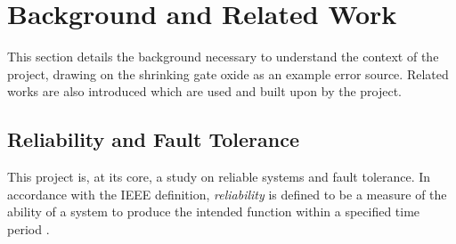 
\section{Background and Related Work}                               
\label{sec:bgrw}

\noindent This section details the background necessary to understand the context of the project, drawing on the shrinking gate oxide as 
an example error source. Related works are also introduced which are used and built upon by the project.

\subsection{Reliability and Fault Tolerance}
\label{sec:bgrw-rft}
\noindent This project is, at its core, a study on reliable systems and fault tolerance. In accordance with the IEEE definition, 
\emph{reliability} is defined to be a measure of the ability of a system to produce the intended function within a specified time 
period \cite{ieee_reliability}. \\

